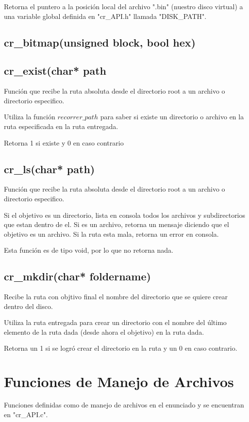 \documentclass[12pt]{article}
\begin{document}
Retorna el puntero a la posición local del archivo ".bin" (nuestro disco virtual) a una variable global definida en "cr\_API.h" llamada "DISK\_PATH".

\subsection{cr\_bitmap(unsigned block, bool hex)}



\subsection{cr\_exist(char* path}
Función que recibe la ruta absoluta desde el directorio root a un archivo o directorio especifico.

Utiliza la función $recorrer\_path$ para saber si existe un directorio o archivo en la ruta especificada en la ruta entregada.

Retorna 1 si existe y 0 en caso contrario

\subsection{cr\_ls(char* path)}
Función que recibe la ruta absoluta desde el directorio root a un archivo o directorio especifico.

Si el objetivo es un directorio, lista en consola todos los archivos y subdirectorios que estan dentro de el. Si es un archivo, retorna un mensaje diciendo que el objetivo es un archivo. Si la ruta esta mala, retorna un error en consola.

Esta función es de tipo void, por lo que no retorna nada.

\subsection{cr\_mkdir(char* foldername)}
Recibe la ruta con objtivo final el nombre del directorio que se quiere crear dentro del disco.

Utiliza la ruta entregada para crear un directorio con el nombre del último elemento de la ruta dada (desde ahora el objetivo) en la ruta dada.

Retorna un 1 si se logró crear el directorio en la ruta y un 0 en caso contrario.

\section{Funciones de Manejo de Archivos}
Funciones definidas como de manejo de archivos en el enunciado y se encuentran en "cr\_API.c".
\end{document}
